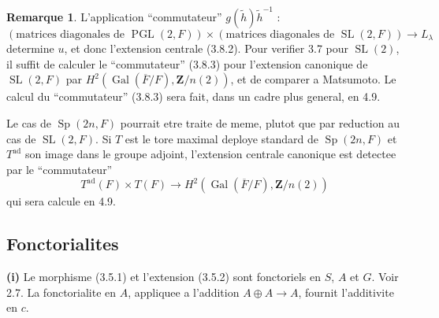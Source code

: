 \documentclass[11pt,a4paper]{article}
\theoremstyle{plain}
\theoremstyle{definition}
\newtheorem{remark}[theorem]{Remarque}
\DeclareMathOperator{\Gal}{Gal}
\DeclareMathOperator{\PGL}{PGL}
\DeclareMathOperator{\SL}{SL}
\DeclareMathOperator{\Sp}{Sp}
\DeclareMathOperator{\ad}{ad}
\begin{document}
\begin{remark}
L'application ``commutateur'' $g(\tilde{h}) \tilde{h}^{-1}$ :
\begin{equation}\label{3.8.3}
(\text{matrices diagonales de } \PGL(2, F)) \times (\text{matrices diagonales de } \SL(2, F)) \to L_\lambda
\end{equation}
determine $u$, et donc l'extension centrale (3.8.2). Pour verifier 3.7 pour $\SL(2)$, il suffit de calculer le ``commutateur'' (3.8.3) pour l'extension canonique de $\SL(2, F)$ par $H^2(\Gal(\overline{F}/F), \mathbf{Z}/n(2))$, et de comparer a Matsumoto. Le calcul du ``commutateur'' (3.8.3) sera fait, dans un cadre plus general, en 4.9.

Le cas de $\Sp(2n, F)$ pourrait etre traite de meme, plutot que par reduction au cas de $\SL(2, F)$. Si $T$ est le tore maximal deploye standard de $\Sp(2n, F)$ et $T^{\ad}$ son image dans le groupe adjoint, l'extension centrale canonique est detectee par le ``commutateur''
\[
T^{\ad}(F) \times T(F) \to H^2(\Gal(\overline{F}/F), \mathbf{Z}/n(2))
\]
qui sera calcule en 4.9.
\end{remark}

\subsection{Fonctorialites}\label{3.9}

\textbf{(i)} Le morphisme (3.5.1) et l'extension (3.5.2) sont fonctoriels en $S$, $A$ et $G$. Voir 2.7. La fonctorialite en $A$, appliquee a l'addition $A \oplus A \to A$, fournit l'additivite en $c$.
\end{document}
